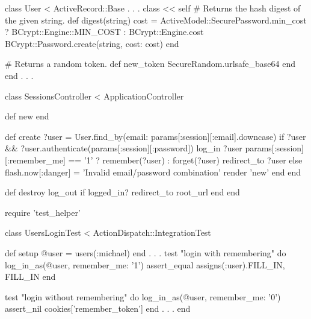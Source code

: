 \begin{codelisting}
\label{code:token_digest_class_self}
\begin{code}
class User < ActiveRecord::Base
  .
  .
  .
  class << self
    # Returns the hash digest of the given string.
    def digest(string)
      cost = ActiveModel::SecurePassword.min_cost ? BCrypt::Engine::MIN_COST :
                                                    BCrypt::Engine.cost
      BCrypt::Password.create(string, cost: cost)
    end

    # Returns a random token.
    def new_token
      SecureRandom.urlsafe_base64
    end
  end
  .
  .
  .
\end{code}
\end{codelisting}

\begin{codelisting}
\label{code:login_create_user_instance}
\begin{code}
class SessionsController < ApplicationController

  def new
  end

  def create
    ?user = User.find_by(email: params[:session][:email].downcase)
    if ?user && ?user.authenticate(params[:session][:password])
      log_in ?user
      params[:session][:remember_me] == '1' ? remember(?user) : forget(?user)
      redirect_to ?user
    else
      flash.now[:danger] = 'Invalid email/password combination'
      render 'new'
    end
  end

  def destroy
    log_out if logged_in?
    redirect_to root_url
  end
end
\end{code}
\end{codelisting}

\begin{codelisting}
\label{code:improved_remember_me_test}
\begin{code}
require 'test_helper'

class UsersLoginTest < ActionDispatch::IntegrationTest

  def setup
    @user = users(:michael)
  end
  .
  .
  .
  test "login with remembering" do
    log_in_as(@user, remember_me: '1')
    assert_equal assigns(:user).FILL_IN, FILL_IN
  end

  test "login without remembering" do
    log_in_as(@user, remember_me: '0')
    assert_nil cookies['remember_token']
  end
  .
  .
  .
end
\end{code}
\end{codelisting}


